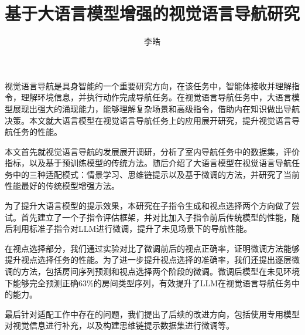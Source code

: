 \documentclass[bachelor]{thesis-uestc}
\title{基于大语言模型增强的视觉语言导航研究}{TODO}
\author{李皓}{Li Hao}
\begin{document}
\makecover

\begin{chineseabstract}
视觉语言导航是具身智能的一个重要研究方向，在该任务中，智能体接收并理解指令，理解环境信息，并执行动作完成导航任务。在视觉语言导航任务中，大语言模型展现出强大的涌现能力，能够理解复杂场景和高级指令，借助内在知识做出导航决策。本文就大语言模型在视觉语言导航任务上的应用展开研究，提升视觉语言导航任务的性能。

本文首先就视觉语言导航的发展展开调研，分析了室内导航任务中的数据集，评价指标，以及基于预训练模型的传统方法。随后介绍了大语言模型在视觉语言导航任务中的三种适配模式：情景学习、思维链提示以及基于微调的方法，并研究了当前性能最好的传统模型增强方法。

为了提升大语言模型的提示效果，本研究在子指令生成和视点选择两个方向做了尝试。首先建立了一个子指令评估框架，并对比加入子指令前后传统模型的性能，随后利用标准子指令对LLM进行微调，提升了未见场景下的导航性能。

在视点选择部分，我们通过实验对比了微调前后的视点正确率，证明微调方法能够提升视点选择任务的性能。为了进一步提升视点选择的准确率，我们还提出逐层微调的方法，包括房间序列预测和视点选择两个阶段的微调。微调后模型在未见环境下能够完全预测正确$63\%$的房间类型序列，有效提升了LLM在视觉语言导航任务中的能力。

最后针对适配工作中存在的问题，我们提出了后续的改进方向，包括使用专用模型对视觉信息进行补充，以及构建思维链提示数据集进行微调等。

\end{chineseabstract}
\end{document}
